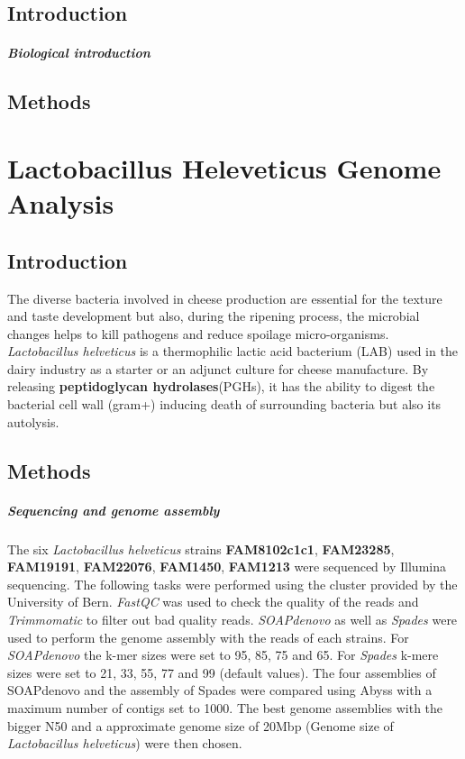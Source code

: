 \documentclass[10pt,a4paper]{report}
\begin{document}
\section*{Introduction}
\paragraph{Biological introduction} 


\section*{Methods}



\chapter*{Lactobacillus Heleveticus Genome Analysis}
\section*{Introduction}

The diverse bacteria involved in cheese production are essential for the texture and taste development but also, during the ripening process, the microbial changes helps to kill pathogens and reduce spoilage micro-organisms. \textit{Lactobacillus helveticus} is a thermophilic lactic acid bacterium (LAB) used in the dairy industry as a starter or an adjunct culture for cheese manufacture\cite{jebava_nine_2011}. By releasing \textbf{peptidoglycan hydrolases}(PGHs), it has the ability to digest the bacterial cell wall (gram+) inducing death of surrounding bacteria but also its autolysis. 

\section*{Methods}

\paragraph{Sequencing and genome assembly}
The six \textit{Lactobacillus helveticus} strains \textbf{FAM8102c1c1}, \textbf{FAM23285}, \textbf{FAM19191}, \textbf{FAM22076}, \textbf{FAM1450}, \textbf{FAM1213}  were sequenced by Illumina sequencing. The following tasks were performed using the cluster provided by the University of Bern.  \textit{FastQC} was used to check the quality of the reads and \textit{Trimmomatic} to filter out bad quality reads. \textit{SOAPdenovo} as well as \textit{Spades} were used to perform the genome assembly with the reads of each strains. For \textit{SOAPdenovo} the k-mer sizes were set to 95, 85, 75 and 65. For \textit{Spades} k-mere sizes were set to 21, 33, 55, 77 and 99 (default values). The four assemblies of SOAPdenovo and the assembly of Spades were compared using Abyss with a maximum number of contigs set to 1000. The best genome assemblies with the bigger N50 and a approximate genome size of 20Mbp (Genome size of \textit{Lactobacillus helveticus}) were then chosen.
\end{document}
